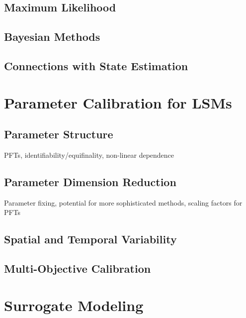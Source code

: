 \documentclass[12pt]{article}
\begin{document}
\subsection{Maximum Likelihood}

\subsection{Bayesian Methods}

\subsection{Connections with State Estimation}


\section{Parameter Calibration for LSMs}
\subsection{Parameter Structure}
PFTs, identifiability/equifinality, non-linear dependence 

\subsection{Parameter Dimension Reduction}
Parameter fixing, potential for more sophisticated methods, scaling factors for PFTs

\subsection{Spatial and Temporal Variability}

\subsection{Multi-Objective Calibration}

\section{Surrogate Modeling}
\end{document}
